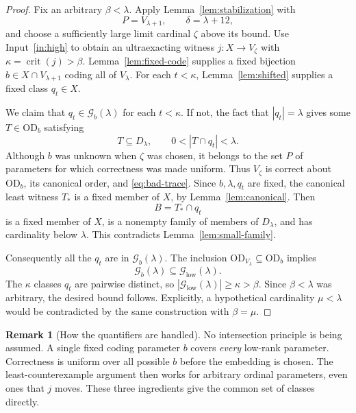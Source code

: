 \documentclass[11pt,letterpaper]{article}
\theoremstyle{definition}
\newcommand{\OD}{\mathrm{OD}}
\newcommand{\crit}{\operatorname{crit}}
\newtheorem{remark}[definition]{Remark}
\numberwithin{equation}{section}
\newcommand{\Good}{\mathcal G}
\begin{document}
\begin{proof}
Fix an arbitrary $\beta<\lambda$. Apply
Lemma~\ref{lem:stabilization} with
\[
                       P=V_{\lambda+1},\qquad \delta=\lambda+12,
\]
and choose a sufficiently large limit cardinal $\zeta$ above its bound.
Use Input~\ref{in:high} to obtain an ultraexacting witness
$j:X\to V_\zeta$ with $\kappa=\crit(j)>\beta$.
Lemma~\ref{lem:fixed-code} supplies a fixed bijection
$b\in X\cap V_{\lambda+1}$ coding all of $V_\lambda$.
For each $t<\kappa$, Lemma~\ref{lem:shifted} supplies a fixed class
$q_t\in X$.

We claim that $q_t\in\Good_b(\lambda)$ for each $t<\kappa$. If not, the
fact that $|q_t|=\lambda$ gives some $T\in\OD_b$ satisfying
\begin{equation}\label{eq:bad-trace}
                  T\subseteq D_\lambda,
                  \qquad 0<|T\cap q_t|<\lambda.
\end{equation}
Although $b$ was unknown when $\zeta$ was chosen, it belongs to the set $P$
of parameters for which correctness was made uniform. Thus
$V_\zeta$ is correct about $\OD_b$, its canonical order, and
\eqref{eq:bad-trace}. Since $b,\lambda,q_t$ are fixed, the canonical least
witness $T_*$ is a fixed member of $X$, by
Lemma~\ref{lem:canonical}. Then
\[
                           B=T_*\cap q_t
\]
is a fixed member of $X$, is a nonempty family of members of $D_\lambda$,
and has cardinality below $\lambda$. This contradicts
Lemma~\ref{lem:small-family}.

Consequently all the $q_t$ are in $\Good_b(\lambda)$. The inclusion
$\OD_{V_\lambda}\subseteq\OD_b$ implies
\[
               \Good_b(\lambda)\subseteq\Good_{\mathrm{low}}(\lambda).
\]
The $\kappa$ classes $q_t$ are pairwise distinct, so
$|\Good_{\mathrm{low}}(\lambda)|\ge\kappa>\beta$. Since $\beta<\lambda$
was arbitrary, the desired bound follows. Explicitly, a hypothetical
cardinality $\mu<\lambda$ would be contradicted by the same construction
with $\beta=\mu$.
\end{proof}

\begin{remark}[How the quantifiers are handled]
No intersection principle is being assumed. A single fixed coding parameter
$b$ covers \emph{every} low-rank parameter. Correctness is uniform over all
possible $b$ before the embedding is chosen. The least-counterexample
argument then works for arbitrary ordinal parameters, even ones that $j$
moves. These three ingredients give the common set of classes directly.
\end{remark}
\end{document}
